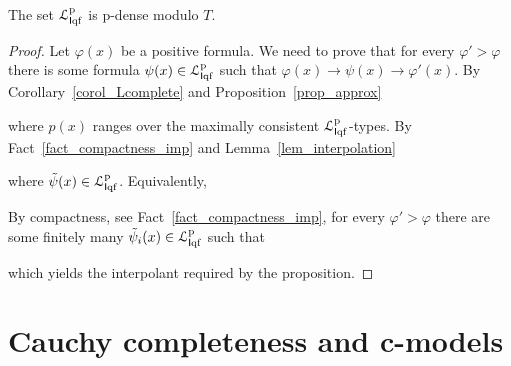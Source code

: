 \documentclass[10pt,oneside]{amsproc}
\begin{document}
{\begin{proposition}\label{prop_LHapprox1}
  The set ${\EuScript L}^{\rm p}_{{\sf I}{\rm qf}}$ is p-dense modulo $T$.
\end{proposition}

\begin{proof}
  Let $\varphi(x)$ be a positive formula.
  We need to prove that for every $\varphi'>\varphi$ there is some formula $\psi(x)\in{\EuScript L}^{\rm p}_{{\sf I}{\rm qf}}$ such that $\varphi(x)\rightarrow\psi(x)\rightarrow\varphi'(x)$.
  By Corollary~\ref{corol_Lcomplete} and Proposition~\ref{prop_approx}


  where $p(x)$ ranges over the maximally consistent ${\EuScript L}^{\rm p}_{{\sf I}{\rm qf}}$-types.
  By Fact~\ref{fact_compactness_imp} and Lemma~\ref{lem_interpolation}


  where $\tilde{\psi}(x)\in{\EuScript L}^{\rm p}_{{\sf I}{\rm qf}}$.
  Equivalently,


  By compactness, see Fact~\ref{fact_compactness_imp}, for every $\varphi'>\varphi$ there are some finitely many $\tilde{\psi}_i(x)\in{\EuScript L}^{\rm p}_{{\sf I}{\rm qf}}$ such that


  which yields the interpolant required by the proposition.
\end{proof}


\section{Cauchy completeness and c-models}\label{Cauchy}


}
\end{document}
